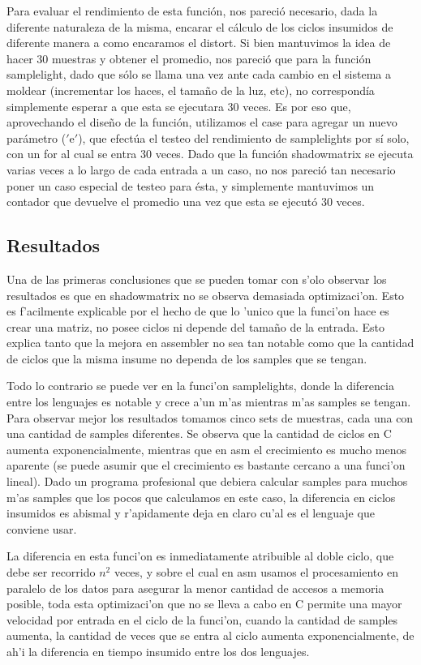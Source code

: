 \documentclass[a4paper,10pt]{article}
\begin{document}
Para evaluar el rendimiento de esta función, nos pareció necesario, dada la diferente naturaleza de la misma, encarar el cálculo de los ciclos insumidos de diferente manera a como encaramos el distort. Si bien mantuvimos la idea de hacer 30 muestras y obtener el promedio, nos pareció que para la función samplelight, dado que sólo se llama una vez ante cada cambio en el sistema a moldear (incrementar los haces, el tamaño de la luz, etc), no correspondía simplemente esperar a que esta se ejecutara 30 veces. Es por eso que, aprovechando el diseño de la función, utilizamos el case para agregar un nuevo parámetro ($'$e$'$), que efectúa el testeo del rendimiento de samplelights por sí solo, con un for al cual se entra 30 veces. Dado que la función shadowmatrix se ejecuta varias veces a lo largo de cada entrada a un caso, no nos pareció tan necesario poner un caso especial de testeo para ésta, y simplemente mantuvimos un contador que devuelve el promedio una vez que esta se ejecutó 30 veces.

\subsection{Resultados}

Una de las primeras conclusiones que se pueden tomar con s'olo observar los resultados es que en shadowmatrix no se observa demasiada optimizaci'on. Esto es f'acilmente explicable por el hecho de que lo 'unico que la funci'on hace es crear una matriz, no posee ciclos ni depende del tamaño de la entrada. Esto explica tanto que la mejora en assembler no sea tan notable como que la cantidad de ciclos que la misma insume no dependa de los samples que se tengan.

Todo lo contrario se puede ver en la funci'on samplelights, donde la diferencia entre los lenguajes es notable y crece a'un m'as mientras m'as samples se tengan. Para observar mejor los resultados tomamos cinco sets de muestras, cada una con una cantidad de samples diferentes. Se observa que la cantidad de ciclos en C aumenta exponencialmente, mientras que en asm el crecimiento es mucho menos aparente (se puede asumir que el crecimiento es bastante cercano a una funci'on lineal). Dado un programa profesional que debiera calcular samples para muchos m'as samples que los pocos que calculamos en este caso, la diferencia en ciclos insumidos es abismal y r'apidamente deja en claro cu'al es el lenguaje que conviene usar.

La diferencia en esta funci'on es inmediatamente atribuible al doble ciclo, que debe ser recorrido $n^{2}$ veces, y sobre el cual en asm usamos el procesamiento en paralelo de los datos para asegurar la menor cantidad de accesos a memoria posible, toda esta optimizaci'on que no se lleva a cabo en C permite una mayor velocidad por entrada en el ciclo de la funci'on, cuando la cantidad de samples aumenta, la cantidad de veces que se entra al ciclo aumenta exponencialmente, de ah'i la diferencia en tiempo insumido entre los dos lenguajes.
\end{document}
